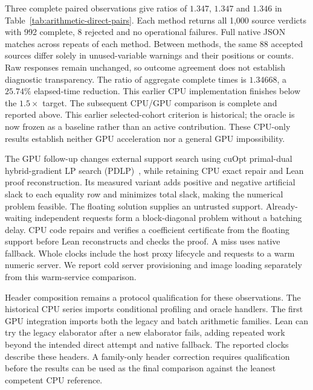 \documentclass[10pt,twocolumn]{article}
\begin{document}
Three complete paired observations give ratios of $1.347$, $1.347$ and $1.346$
in Table~\ref{tab:arithmetic-direct-pairs}. Each method returns all 1,000
source verdicts with 992 complete, 8 rejected and no operational failures.
Full native JSON matches across repeats of each method.
Between methods, the same 88 accepted sources differ solely in unused-variable
warnings and their positions or counts. Raw responses remain unchanged,
so outcome agreement does not establish diagnostic transparency.
The ratio of aggregate complete times is $1.34668$, a $25.74\%$ elapsed-time
reduction. This earlier CPU implementation finishes below the $1.5\times$ target.
The subsequent CPU/GPU comparison is complete and reported above. This
earlier selected-cohort criterion is historical; the oracle is now frozen
as a baseline rather than an active contribution. These CPU-only results establish neither GPU acceleration nor
a general GPU impossibility.

The GPU follow-up changes external support search using cuOpt
primal-dual hybrid-gradient LP search (PDLP)~\cite{nvidia-cuopt-2026}, while retaining CPU exact repair and Lean proof
reconstruction. Its measured variant adds positive and negative artificial
slack to each equality row and minimizes total slack, making the numerical
problem feasible. The floating solution supplies an untrusted support.
Already-waiting independent requests form a block-diagonal problem without
a batching delay. CPU code repairs and verifies a coefficient certificate
from the floating support before Lean reconstructs and checks the proof.
A miss uses native fallback. Whole clocks include the host proxy lifecycle and requests
to a warm numeric server. We report cold server provisioning and image
loading separately from this warm-service comparison.

Header composition remains a protocol qualification for these observations.
The historical CPU series imports conditional profiling and oracle handlers.
The first GPU integration imports both the legacy and batch arithmetic
families. Lean can try the legacy elaborator after a new elaborator fails,
adding repeated work beyond the intended direct attempt and native fallback.
The reported clocks describe these headers. A family-only header correction
requires qualification before the results can be used as the final comparison
against the leanest competent CPU reference.
\end{document}
